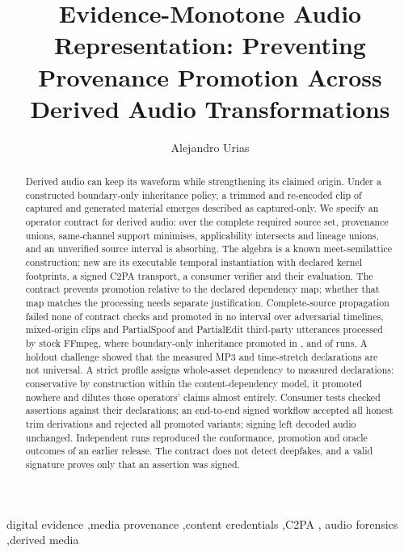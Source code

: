 \documentclass[preprint,3p,11pt,authoryear]{elsarticle}
\begin{document}
\begin{frontmatter}

\title{Evidence-Monotone Audio Representation: Preventing Provenance
Promotion Across Derived Audio Transformations}

\author[aur]{Alejandro Urias}
\address[aur]{Independent researcher, Hermosillo, Sonora, Mexico}

\begin{abstract}
Derived audio can keep its waveform while strengthening its claimed origin. Under a constructed boundary-only inheritance policy, a trimmed and re-encoded
clip of captured and generated material emerges described as captured-only. We specify an operator contract for derived audio: over the complete
required source set, provenance unions, same-channel support minimises,
applicability intersects and lineage unions, and an unverified source interval is
absorbing. The algebra is a known meet-semilattice construction; new are its
executable temporal instantiation with declared kernel footprints, a signed C2PA
transport, a consumer verifier and their evaluation. The contract prevents
promotion relative to the declared dependency map; whether that map matches
the processing needs separate justification. Complete-source propagation failed none of \Achecks{} contract checks
and promoted in no interval over \Btimelines{} adversarial timelines, \Cclips{}
mixed-origin clips and \Qclips{} PartialSpoof and \Rclips{} PartialEdit
third-party utterances processed by stock FFmpeg, where boundary-only
inheritance promoted in \Deither{}, \Qeither{} and \Reither{} of \Druns{} runs. A holdout challenge showed that the
measured MP3 and time-stretch declarations are not universal. A strict profile
assigns whole-asset dependency to measured declarations: conservative by construction within the content-dependency
model, it promoted nowhere and dilutes those operators' claims almost entirely. Consumer tests checked assertions against their declarations;
an end-to-end signed workflow accepted all \PtwoHonest{} honest trim derivations
and rejected all \PtwoWrongFlagged{} promoted variants; signing left decoded audio unchanged. Independent
runs reproduced the conformance, promotion and oracle outcomes of
an earlier release. The contract
does not detect deepfakes, and a valid signature proves only that an assertion
was signed.
\end{abstract}

\begin{keyword}
digital evidence \sep media provenance \sep content credentials \sep C2PA \sep
audio forensics \sep derived media
\end{keyword}

\end{frontmatter}
\end{document}
